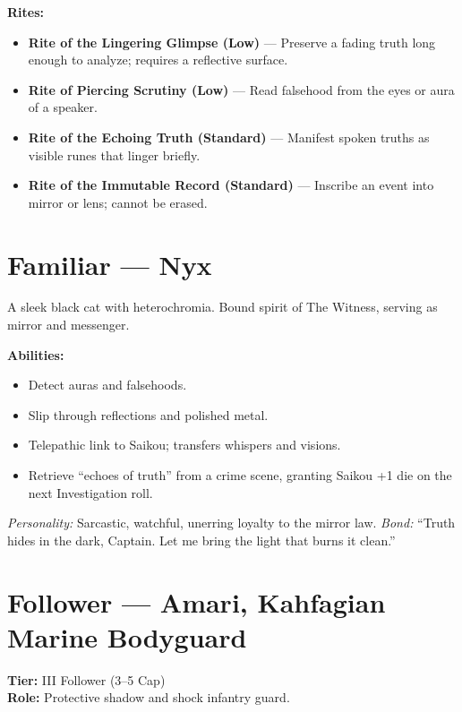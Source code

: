 \documentclass[11pt]{article}
\begin{document}
\textbf{Rites:}
\begin{itemize}
  \item \textbf{Rite of the Lingering Glimpse (Low)} --- Preserve a fading truth long enough to analyze; requires a reflective surface.
  \item \textbf{Rite of Piercing Scrutiny (Low)} --- Read falsehood from the eyes or aura of a speaker.
  \item \textbf{Rite of the Echoing Truth (Standard)} --- Manifest spoken truths as visible runes that linger briefly.
  \item \textbf{Rite of the Immutable Record (Standard)} --- Inscribe an event into mirror or lens; cannot be erased.
\end{itemize}

\section*{Familiar --- Nyx}
A sleek black cat with heterochromia.  
Bound spirit of The Witness, serving as mirror and messenger.

\textbf{Abilities:}
\begin{itemize}
  \item Detect auras and falsehoods.
  \item Slip through reflections and polished metal.
  \item Telepathic link to Saikou; transfers whispers and visions.
  \item Retrieve ``echoes of truth'' from a crime scene, granting Saikou +1 die on the next Investigation roll.
\end{itemize}

\emph{Personality:} Sarcastic, watchful, unerring loyalty to the mirror law.  
\emph{Bond:} ``Truth hides in the dark, Captain. Let me bring the light that burns it clean.''

\section*{Follower --- Amari, Kahfagian Marine Bodyguard}
\textbf{Tier:} III Follower (3--5 Cap)\\
\textbf{Role:} Protective shadow and shock infantry guard.
\end{document}
